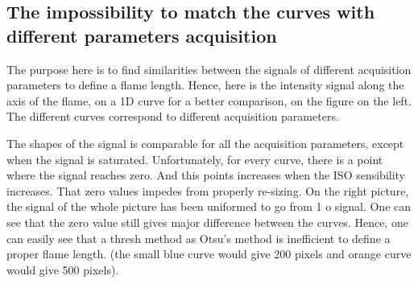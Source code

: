 \subsection{The impossibility to match the curves with different parameters acquisition}

The purpose here is to find similarities between the signals of different acquisition parameters to define a flame length. Hence, here is the intensity signal along the axis of the flame, on a 1D curve for a better comparison, on the figure on the left. The different curves correspond to different acquisition parameters. 

The shapes of the signal is comparable for all the acquisition parameters, except when the signal is saturated. Unfortunately, for every curve, there is a point where the signal reaches zero. And this points increases when the ISO sensibility increases. That zero values impedes from properly re-sizing. On the right picture, the signal of the whole picture has been uniformed to go from 1 o  signal. One can see that the zero value still gives major difference between the curves. Hence, one can easily see that a thresh method as Otsu's method is inefficient to define a proper flame length. (the small blue curve would give 200 pixels and orange curve would give 500 pixels). 

